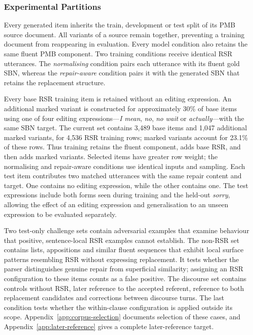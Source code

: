 \subsubsection{Experimental Partitions}

Every generated item inherits the train, development or test split of its PMB
source document. All variants of a source remain together, preventing a
training document from reappearing in evaluation. Every model condition also
retains the same fluent PMB component. Two training conditions receive
identical RSR utterances. The \emph{normalising} condition pairs each utterance
with its fluent gold SBN, whereas the \emph{repair-aware} condition pairs it
with the generated SBN that retains the replacement structure.

Every base RSR training item is retained without an editing expression.
An additional marked variant is constructed for approximately 30\% of base
items using one of four editing expressions---\textit{I mean}, \textit{no},
\textit{no wait} or \textit{actually}---with the same SBN target.
The current set contains 3,489 base items and 1,047 additional marked
variants, for 4,536 RSR training rows; marked variants account for 23.1\%
of these rows. Thus training retains the fluent component, adds base RSR,
and then adds marked variants. Selected items have greater row weight;
the normalising and repair-aware conditions use identical inputs and sampling.
Each test item contributes
two matched utterances with the same repair content and target.
One contains no editing expression, while the other contains one. The test
expressions include both forms seen during training and the held-out
\textit{sorry}, allowing the effect of an editing expression and
generalisation to an unseen expression to be evaluated separately.

Two test-only challenge sets contain adversarial examples that examine
behaviour that positive, sentence-local RSR examples cannot establish. The
non-RSR set contains lists, appositions and similar fluent sequences that
exhibit local surface patterns resembling RSR without expressing replacement.
It tests whether the parser distinguishes genuine repair from superficial
similarity; assigning an RSR configuration to these items counts as a false
positive. The discourse set contains controls without RSR, later reference to
the accepted referent, reference to both replacement candidates and
corrections between discourse turns. The last condition tests whether the
within-clause configuration is applied outside its scope.
Appendix~\ref{app:corpus-selection} documents selection of these cases, and
Appendix~\ref{app:later-reference} gives a complete later-reference target.

